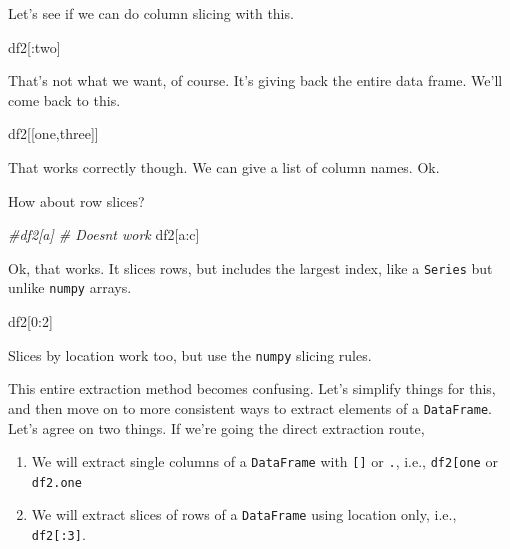 \documentclass[
  letterpaper,
]{scrbook}
\newenvironment{Shaded}{\begin{snugshade}}{\end{snugshade}}
\newcommand{\CommentTok}[1]{\textcolor[rgb]{0.56,0.35,0.01}{\textit{#1}}}
\newcommand{\DecValTok}[1]{\textcolor[rgb]{0.00,0.00,0.81}{#1}}
\newcommand{\NormalTok}[1]{#1}
\newcommand{\StringTok}[1]{\textcolor[rgb]{0.31,0.60,0.02}{#1}}
\providecommand{\tightlist}{%
  \setlength{\itemsep}{0pt}\setlength{\parskip}{0pt}}
\begin{document}
Let's see if we can do column slicing with this.

\begin{Shaded}
\begin{Highlighting}[]
\NormalTok{df2[:}\StringTok{\textquotesingle{}two\textquotesingle{}}\NormalTok{]}
\end{Highlighting}
\end{Shaded}

That's not what we want, of course. It's giving back the entire data frame. We'll come back to this.

\begin{Shaded}
\begin{Highlighting}[]
\NormalTok{df2[[}\StringTok{\textquotesingle{}one\textquotesingle{}}\NormalTok{,}\StringTok{\textquotesingle{}three\textquotesingle{}}\NormalTok{]]}
\end{Highlighting}
\end{Shaded}

That works correctly though. We can give a list of column names. Ok.

How about row slices?

\begin{Shaded}
\begin{Highlighting}[]
\CommentTok{\#df2[\textquotesingle{}a\textquotesingle{}] \# Doesn\textquotesingle{}t work}
\NormalTok{df2[}\StringTok{\textquotesingle{}a\textquotesingle{}}\NormalTok{:}\StringTok{\textquotesingle{}c\textquotesingle{}}\NormalTok{] }
\end{Highlighting}
\end{Shaded}

Ok, that works. It slices rows, but includes the largest index, like a \texttt{Series} but unlike \texttt{numpy} arrays.

\begin{Shaded}
\begin{Highlighting}[]
\NormalTok{df2[}\DecValTok{0}\NormalTok{:}\DecValTok{2}\NormalTok{]}
\end{Highlighting}
\end{Shaded}

Slices by location work too, but use the \texttt{numpy} slicing rules.

This entire extraction method becomes confusing. Let's simplify things for this, and then move on to more consistent ways to extract elements of a \texttt{DataFrame}. Let's agree on two things. If we're going the direct extraction route,

\begin{enumerate}
\def\labelenumi{\arabic{enumi}.}
\tightlist
\item
  We will extract single columns of a \texttt{DataFrame} with \texttt{{[}{]}} or \texttt{.}, i.e., \texttt{df2{[}\textquotesingle{}one\textquotesingle{}{]}} or \texttt{df2.one}
\item
  We will extract slices of rows of a \texttt{DataFrame} using location only, i.e., \texttt{df2{[}:3{]}}.
\end{enumerate}
\end{document}

